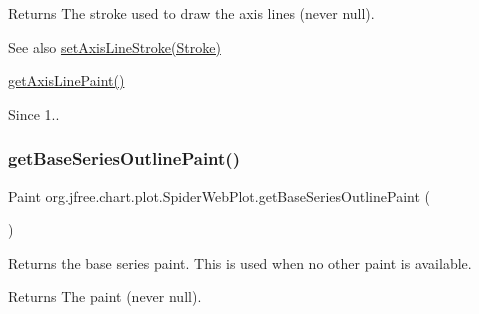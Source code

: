 \begin{DoxyReturn}{Returns}
The stroke used to draw the axis lines (never {\ttfamily null}).
\end{DoxyReturn}
\begin{DoxySeeAlso}{See also}
\mbox{\hyperlink{classorg_1_1jfree_1_1chart_1_1plot_1_1_spider_web_plot_a9643dc83b765d2e02295a4f08369b5a4}{set\+Axis\+Line\+Stroke(\+Stroke)}} 

\mbox{\hyperlink{classorg_1_1jfree_1_1chart_1_1plot_1_1_spider_web_plot_a552604854e1b6d275f5dd2d94543ca7c}{get\+Axis\+Line\+Paint()}} 
\end{DoxySeeAlso}
\begin{DoxySince}{Since}
1.. 
\end{DoxySince}
\mbox{\label{classorg_1_1jfree_1_1chart_1_1plot_1_1_spider_web_plot_a7205fdee6144d8dd81316692b3c8f8a7}} 
\subsubsection{\texorpdfstring{get\+Base\+Series\+Outline\+Paint()}{getBaseSeriesOutlinePaint()}}
{\footnotesize\ttfamily Paint org.\+jfree.\+chart.\+plot.\+Spider\+Web\+Plot.\+get\+Base\+Series\+Outline\+Paint (\begin{DoxyParamCaption}{ }\end{DoxyParamCaption})}

Returns the base series paint. This is used when no other paint is available.

\begin{DoxyReturn}{Returns}
The paint (never {\ttfamily null}). 
\end{DoxyReturn}
\mbox{\label{classorg_1_1jfree_1_1chart_1_1plot_1_1_spider_web_plot_a8033dcbea4dad86e0453fbbc824702ad}} 
